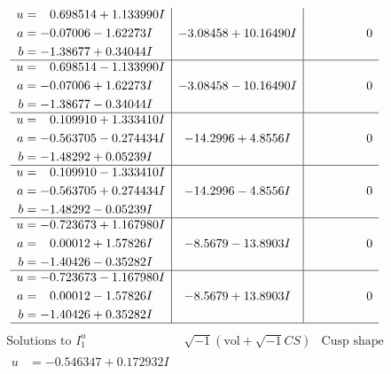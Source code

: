 \documentclass[1p]{elsarticle_modified}
\theoremstyle{definition}
\newcommand{\I}{\sqrt{-1}}
\begin{document}
$$\begin{array}{c|c|c}
\begin{aligned}
u &= \phantom{-}0.698514 + 1.133990 I \\
a &= -0.07006 - 1.62273 I \\
b &= -1.38677 + 0.34044 I\end{aligned}
 & -3.08458 + 10.16490 I & \phantom{-0.000000 } 0 \\ \hline\begin{aligned}
u &= \phantom{-}0.698514 - 1.133990 I \\
a &= -0.07006 + 1.62273 I \\
b &= -1.38677 - 0.34044 I\end{aligned}
 & -3.08458 - 10.16490 I & \phantom{-0.000000 } 0 \\ \hline\begin{aligned}
u &= \phantom{-}0.109910 + 1.333410 I \\
a &= -0.563705 - 0.274434 I \\
b &= -1.48292 + 0.05239 I\end{aligned}
 & -14.2996 + 4.8556 I & \phantom{-0.000000 } 0 \\ \hline\begin{aligned}
u &= \phantom{-}0.109910 - 1.333410 I \\
a &= -0.563705 + 0.274434 I \\
b &= -1.48292 - 0.05239 I\end{aligned}
 & -14.2996 - 4.8556 I & \phantom{-0.000000 } 0 \\ \hline\begin{aligned}
u &= -0.723673 + 1.167980 I \\
a &= \phantom{-}0.00012 + 1.57826 I \\
b &= -1.40426 - 0.35282 I\end{aligned}
 & -8.5679 - 13.8903 I & \phantom{-0.000000 } 0 \\ \hline\begin{aligned}
u &= -0.723673 - 1.167980 I \\
a &= \phantom{-}0.00012 - 1.57826 I \\
b &= -1.40426 + 0.35282 I\end{aligned}
 & -8.5679 + 13.8903 I & \phantom{-0.000000 } 0\\
 \hline 
 \end{array}$$\newpage$$\begin{array}{c|c|c}  
\text{Solutions to }I^u_{1}& \I (\text{vol} + \sqrt{-1}CS) & \text{Cusp shape}\\
 \hline 
\begin{aligned}
u &= -0.546347 + 0.172932 I \\

\end{aligned}
\end{array}$$
\end{document}
